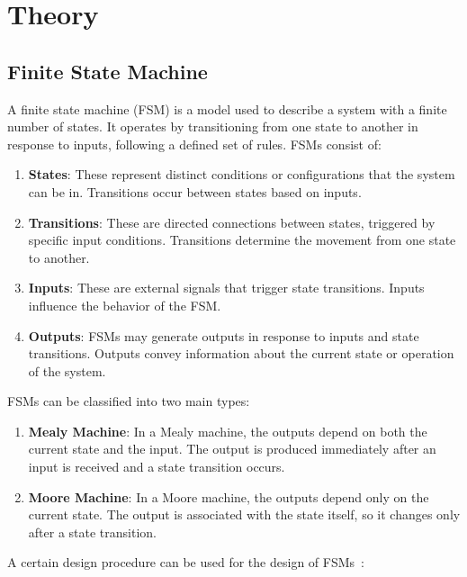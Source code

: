 \newpage
\section{Theory}
\label{sec:theory}



\subsection{Finite State Machine}
\label{subsec:fsm_theory}

A finite state machine (FSM) is a model used to describe a system with a finite number of states. It operates by transitioning from one state to another in response to inputs, following a defined set of rules. FSMs consist of:

\begin{enumerate}
    \item \textbf{States}: These represent distinct conditions or configurations that the system can be in. Transitions occur between states based on inputs.
    
    \item \textbf{Transitions}: These are directed connections between states, triggered by specific input conditions. Transitions determine the movement from one state to another.
    
    \item \textbf{Inputs}: These are external signals that trigger state transitions. Inputs influence the behavior of the FSM.
    
    \item \textbf{Outputs}: FSMs may generate outputs in response to inputs and state transitions. Outputs convey information about the current state or operation of the system.
\end{enumerate}

\noindent
FSMs can be classified into two main types:

\begin{enumerate}
    \item \textbf{Mealy Machine}: In a Mealy machine, the outputs depend on both the current state and the input. The output is produced immediately after an input is received and a state transition occurs.
    
    \item \textbf{Moore Machine}: In a Moore machine, the outputs depend only on the current state. The output is associated with the state itself, so it changes only after a state transition.
\end{enumerate}
\noindent
A certain design procedure can be used for the design of FSMs~\cite{digital_design}:

